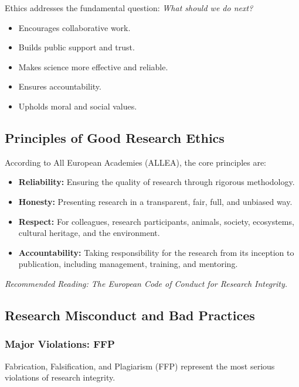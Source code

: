 \documentclass{article}
\begin{document}
Ethics addresses the fundamental question: \textit{What should we do next?}
\begin{itemize}
    \item Encourages collaborative work.
    \item Builds public support and trust.
    \item Makes science more effective and reliable.
    \item Ensures accountability.
    \item Upholds moral and social values.
\end{itemize}

\subsection{Principles of Good Research Ethics}
\label{sec:principles}

According to All European Academies (ALLEA), the core principles are:
\begin{itemize}
    \item \textbf{Reliability:} Ensuring the quality of research through rigorous methodology.
    \item \textbf{Honesty:} Presenting research in a transparent, fair, full, and unbiased way.
    \item \textbf{Respect:} For colleagues, research participants, animals, society, ecosystems, cultural heritage, and the environment.
    \item \textbf{Accountability:} Taking responsibility for the research from its inception to publication, including management, training, and mentoring.
\end{itemize}

\textit{Recommended Reading: The European Code of Conduct for Research Integrity.}

\subsection{Research Misconduct and Bad Practices}\label{sec:misconduct}

\subsubsection{Major Violations: FFP}
Fabrication, Falsification, and Plagiarism (FFP) represent the most serious violations of research integrity.
\end{document}

